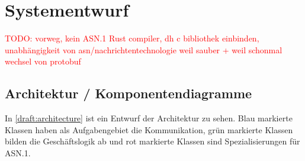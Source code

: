 \documentclass[
	12pt,
	table,
	bigheadings,
	ngerman,
	a4paper,
	BCOR5mm,
	DIV14,
	1.1headlines,
	pagesize,
	oneside,
	openright,
	titlepage,
	headsepline,
	nochapterprefix,
	bibtotoc,
	tocindent,
	listsindent,
	pointlessnumbers,
	cleardoubleempty,
	fleqn,
	halfparskip
]{scrbook}
\newcommand{\todo}[1]{\textcolor{red}{TODO: #1}}
\begin{document}
	\sloppy
	
	\setcounter{page}{0}
	
	
	
	
	
	
	
	\thispagestyle{empty}
	
	
	\clearpage	
	\hypersetup{allcolors=black}
	\tableofcontents
	\hypersetup{allcolors=blue}
	\newpage
	
	
	\setcounter{page}{1}
	
	
	
	
		
	
	
	
	
	
	
	
		
	
	\chapter{Systementwurf}
	
		\todo{vorweg, kein ASN.1 Rust compiler, dh c bibliothek einbinden, unabhängigkeit von asn/nachrichtentechnologie weil sauber + weil schonmal wechsel von protobuf}
	
		\section{Architektur / Komponentendiagramme}
				
		In \autoref{draft:architecture} ist ein Entwurf der Architektur zu sehen.
		Blau markierte Klassen haben als Aufgabengebiet die Kommunikation, grün markierte Klassen bilden die Geschäftslogik ab und rot markierte Klassen sind Spezialisierungen für ASN.1.
		
\end{document}
